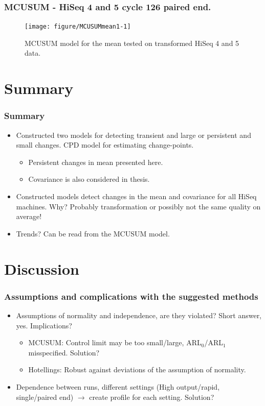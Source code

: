 \documentclass[10pt]{beamer}\usepackage[]{graphicx}\usepackage[]{color}
\newenvironment{knitrout}{}{} %
\begin{document}
\begin{frame}\frametitle{MCUSUM - HiSeq 4 and 5 cycle 126 paired end.}
\begin{knitrout}
\color{fgcolor}\begin{figure}
\texttt{[image: figure/MCUSUMmean1-1]} \caption[MCUSUM model for the mean tested on transformed HiSeq 4 and 5 data]{MCUSUM model for the mean tested on transformed HiSeq 4 and 5 data.}\label{fig:MCUSUMmean1}
\end{figure}


\end{knitrout}
\end{frame}
 
 \section{Summary}
 \begin{frame}\frametitle{Summary}
 \begin{itemize}
 \item Constructed two models for detecting transient and large or persistent and small changes. CPD model for estimating change-points.
 \begin{itemize}
 \item Persistent changes in mean presented here. 
 \item Covariance is also considered in thesis.
 \end{itemize}
 \item Constructed models detect changes in the mean and covariance for all HiSeq machines. Why? \pause
 Probably transformation or possibly not the same quality on average!
 \item Trends? Can be read from the MCUSUM model. 
 \end{itemize}
 \end{frame}

 \section{Discussion}
 \begin{frame}\frametitle{Assumptions and complications with the suggested methods}
 \begin{itemize}
 \item Assumptions of normality and independence, are they violated? Short answer, yes. Implications?
 \pause
 \begin{itemize}
 \item MCUSUM: Control limit may be too small/large, ARL$_0$/ARL$_1$ misspecified. Solution?
 \item Hotellings: Robust against deviations of the assumption of normality. 
 \end{itemize}
\item Dependence between runs, different settings (High output/rapid, single/paired end) $\rightarrow$ create profile for each setting. Solution? 
 \end{itemize}
 
 \end{frame}
\end{document}
